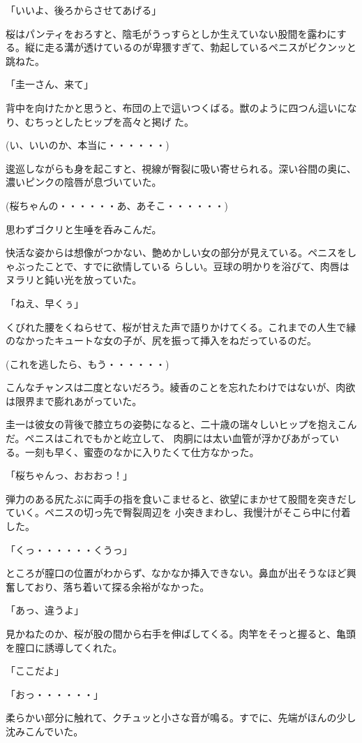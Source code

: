 ﻿\documentclass[book,tate]{jlreq}
\begin{document}
「いいよ、後ろからさせてあげる」

桜はパンティをおろすと、陰毛がうっすらとしか生えていない股間を露わにする。縦に走る溝が透けているのが卑猥すぎて、勃起しているペニスがビクンッと跳ねた。

「圭一さん、来て」

背中を向けたかと思うと、布団の上で這いつくばる。獣のように四つん這いになり、むちっとしたヒップを高々と掲げ た。

(い、いいのか、本当に・・・・・・)

逡巡しながらも身を起こすと、視線が臀裂に吸い寄せられる。深い谷間の奥に、濃いピンクの陰唇が息づいていた。

(桜ちゃんの・・・・・・あ、あそこ・・・・・・)

思わずゴクリと生唾を呑みこんだ。

快活な姿からは想像がつかない、艶めかしい女の部分が見えている。ペニスをしゃぶったことで、すでに欲情している らしい。豆球の明かりを浴びて、肉唇はヌラリと鈍い光を放っていた。

「ねえ、早くぅ」

くびれた腰をくねらせて、桜が甘えた声で語りかけてくる。これまでの人生で縁のなかったキュートな女の子が、尻を振って挿入をねだっているのだ。

(これを逃したら、もう・・・・・・)

こんなチャンスは二度とないだろう。綾香のことを忘れたわけではないが、肉欲は限界まで膨れあがっていた。

圭一は彼女の背後で膝立ちの姿勢になると、二十歳の瑞々しいヒップを抱えこんだ。ペニスはこれでもかと屹立して、 肉胴には太い血管が浮かびあがっている。一刻も早く、蜜壺のなかに入りたくて仕方なかった。

「桜ちゃんっ、おおおっ！」

弾力のある尻たぶに両手の指を食いこませると、欲望にまかせて股間を突きだしていく。ペニスの切っ先で臀裂周辺を 小突きまわし、我慢汁がそこら中に付着した。

「くっ・・・・・・くうっ」

ところが膣口の位置がわからず、なかなか挿入できない。鼻血が出そうなほど興奮しており、落ち着いて探る余裕がなかった。

「あっ、違うよ」

見かねたのか、桜が股の間から右手を伸ばしてくる。肉竿をそっと握ると、亀頭を膣口に誘導してくれた。

「ここだよ」

「おっ・・・・・・」

柔らかい部分に触れて、クチュッと小さな音が鳴る。すでに、先端がほんの少し沈みこんでいた。
\end{document}
